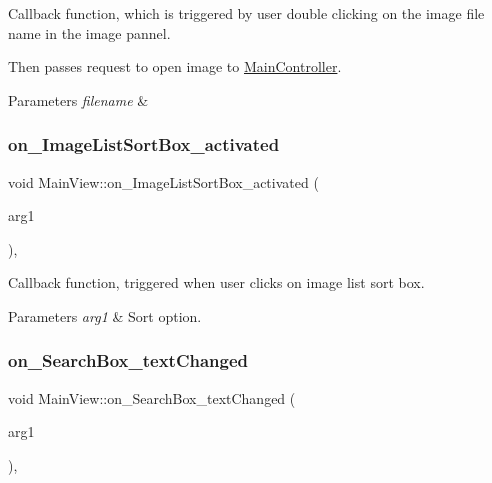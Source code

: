 Callback function, which is triggered by user double clicking on the image file name in the image pannel. 

Then passes request to open image to \hyperlink{classMainController}{Main\+Controller}.


\begin{DoxyParams}{Parameters}
{\em filename} & \\
\hline
\end{DoxyParams}
\mbox{\label{classMainView_a682bc17938f71ec37ba9485fb3a0f71b}} 
\subsubsection{\texorpdfstring{on\+\_\+\+Image\+List\+Sort\+Box\+\_\+activated}{on\_ImageListSortBox\_activated}}
{\footnotesize\ttfamily void Main\+View\+::on\+\_\+\+Image\+List\+Sort\+Box\+\_\+activated (\begin{DoxyParamCaption}\item[{const Q\+String \&}]{arg1 }\end{DoxyParamCaption})\hspace{0.3cm}{\ttfamily [private]}, {\ttfamily [slot]}}



Callback function, triggered when user clicks on image list sort box. 


\begin{DoxyParams}{Parameters}
{\em arg1} & Sort option. \\
\hline
\end{DoxyParams}
\mbox{\label{classMainView_ae8529f73ea1db1a678c9730495b444a9}} 
\subsubsection{\texorpdfstring{on\+\_\+\+Search\+Box\+\_\+text\+Changed}{on\_SearchBox\_textChanged}}
{\footnotesize\ttfamily void Main\+View\+::on\+\_\+\+Search\+Box\+\_\+text\+Changed (\begin{DoxyParamCaption}\item[{const Q\+String \&}]{arg1 }\end{DoxyParamCaption})\hspace{0.3cm}{\ttfamily [private]}, {\ttfamily [slot]}}



